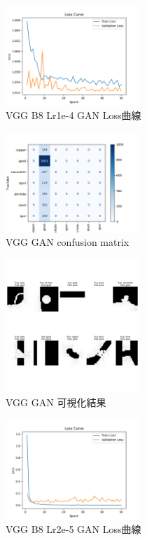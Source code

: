 \begin{figure}[htbp]
    \centering
    \includegraphics[width=0.45\textwidth]{./img/VGG/P5.png}
    \caption{VGG B8 Lr1e-4 GAN Loss曲線}
    \label{fig:VGG_P5}
\end{figure}
\begin{figure}[htbp]
    \centering
    \includegraphics[width=0.45\textwidth]{./img/VGG/P6.png}
    \caption{VGG GAN confusion matrix}
    \label{fig:VGG_P6}
\end{figure}
\begin{figure}[htbp]
    \centering
    \includegraphics[width=0.45\textwidth]{./img/VGG/P7.png}
    \caption{VGG GAN 可視化結果} 
    \label{fig:VGG_P7}
\end{figure}
\begin{figure}[htbp]
    \centering
    \includegraphics[width=0.45\textwidth]{./img/VGG/P8.png}
    \caption{VGG B8 Lr2e-5 GAN Loss曲線}
    \label{fig:VGG_P8}
\end{figure}
